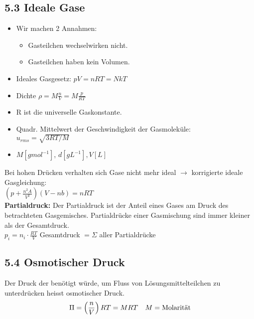 \subsection{5.3 Ideale Gase}
    \begin{itemize}
        \item Wir machen 2 Annahmen:
        \begin{itemize}
            \item Gasteilchen wechselwirken nicht.
            \item Gasteilchen haben kein Volumen.
        \end{itemize}
        \item Ideales Gasgesetz: $pV = nRT=N kT$
        \item Dichte $\rho = M\frac{n}{V}=M\frac{p}{RT}$
        \item R ist die universelle Gaskonstante.\vspace*{1mm}
        \item Quadr. Mittelwert der Geschwindigkeit der Gasmoleküle:\\ $u_{rms}=\sqrt{3RT/M}$
        \item $M\left[ gmol^{-1} \right]$, $d\left[ gL^{-1} \right], V\left[L\right]$
    \end{itemize}
    \vspace{1mm}
    Bei hohen Drücken verhalten sich Gase nicht mehr ideal $\rightarrow$  korrigierte
    ideale Gasgleichung:\\\quad\quad$(p+\frac{n^2A}{V^2})(V-nb)=nRT$\\
    \textbf{Partialdruck:} Der Partialdruck ist der Anteil eines Gases am Druck des betrachteten Gasgemisches. Partialdrücke einer Gasmischung sind immer kleiner als der Gesamtdruck.\vspace{0.5mm}\\
    $p_i=n_i\cdot\frac{RT}{V}$ Gesamtdruck $=\Sigma$ aller Partialdrücke



\subsection{5.4 Osmotischer Druck}
    Der Druck der benötigt würde, um Fluss von Lösungsmittelteilchen zu unterdrücken heisst
    osmotischer Druck.
    \begin{equation*}
        \Pi = \left(\frac{n}{V}\right)RT=MRT \text{\quad} M = \text{Molarität}
    \end{equation*}